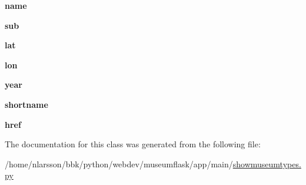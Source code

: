 \begin{DoxyCompactItemize}
{\bfseries name}
\item 
\mbox{\label{classshowmuseumtypes_1_1ShowMuseumTypes_a0c0bfa715345446b141a6e2ec2270a09}} 
{\bfseries sub}
\item 
\mbox{\label{classshowmuseumtypes_1_1ShowMuseumTypes_a654f4b8b0f13d330b16ade3ccea40533}} 
{\bfseries lat}
\item 
\mbox{\label{classshowmuseumtypes_1_1ShowMuseumTypes_a8adb5d39c0b8c5f8776fdf3b00c9c3bc}} 
{\bfseries lon}
\item 
\mbox{\label{classshowmuseumtypes_1_1ShowMuseumTypes_a91b12cd085a8e536a09cf0bfdd87d9f1}} 
{\bfseries year}
\item 
\mbox{\label{classshowmuseumtypes_1_1ShowMuseumTypes_a515f5cbee238adc888426190f6db6a8c}} 
{\bfseries shortname}
\item 
\mbox{\label{classshowmuseumtypes_1_1ShowMuseumTypes_acfaa788edda9587a30d570bfecdf3032}} 
{\bfseries href}
\end{DoxyCompactItemize}


The documentation for this class was generated from the following file\+:\begin{DoxyCompactItemize}
\item 
/home/nlarsson/bbk/python/webdev/museumflask/app/main/\mbox{\hyperlink{showmuseumtypes_8py}{showmuseumtypes.\+py}}\end{DoxyCompactItemize}

